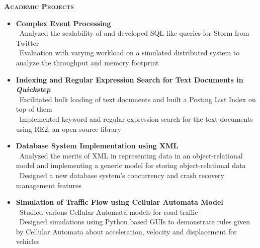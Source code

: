 \documentclass[11pt]{article}
\begin{document}
\begin{mdframed}[backgroundcolor=light-gray, linecolor=light-gray, roundcorner=10pt, shadow=false, shadowsize=1pt]
\Large{\textbf{\textsc{Academic Projects}}}
\end{mdframed}
\begin{itemize}\addtolength{\itemsep}{-0.5\baselineskip}%
\item{\textbf{Complex Event Processing}}\\
	\textendash\ Analyzed the scalability of and developed SQL like queries for Storm from Twitter\\
	\textendash\ Evaluation with varying workload on a simulated distributed system to analyze the throughput and memory footprint\\
\item{\textbf{Indexing and Regular Expression Search for Text Documents in \textit{Quickstep}}}\\
	\textendash\ Facilitated bulk loading of text documents and built a Posting List Index on top of them\\
	\textendash\ Implemented keyword and regular expression search for the text documents using RE2, an open source library\\
\item{\textbf{Database System Implementation using XML}}\\
	\textendash\ Analyzed the merits of XML in representing data in an object-relational model and implementing a generic model for storing object-relational data\\
	\textendash\ Designed a new database system's concurrency and crash recovery management features\\
	\item{\textbf{Simulation of Traffic Flow using Cellular Automata Model}}\\
	\textendash\ Studied various Cellular Automata models for road traffic\\
	\textendash\ Designed simulations using Python based GUIs to demonstrate rules given by Cellular Automata about acceleration, velocity and displacement for vehicles\\
\end{itemize}
\end{document}
